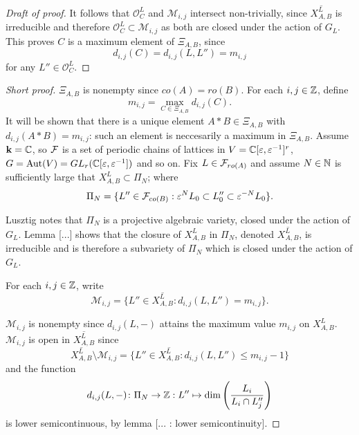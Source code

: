 \documentclass[a4paper, 11pt]{report}
\begin{document}
\begin{proof}[Draft of proof]
It follows that $\mathcal{O}_C^L$ and $\mathcal{M}_{i,j}$ intersect non-trivially, since $\overline{X_{A,B}^L}$ is irreducible and therefore $\mathcal{O}_C^L\subset \mathcal{M}_{i,j}$ as both are closed under the action of $G_L$. This proves $C$ is a maximum element of $\Xi_{A,B}$, since
\begin{equation*}
d_{i,j}(C) = d_{i,j}(L,L'') = m_{i,j}
\end{equation*}
for any $L''\in\mathcal{O}_C^L$.

\end{proof}

\begin{proof}[Short proof]
$\Xi_{A,B}$ is nonempty since $co(A)=ro(B)$. For each $i,j\in\mathbb{Z}$, define
\begin{equation*}
m_{i,j} = \max_{C\in\Xi_{A,B}} d_{i,j}(C).
\end{equation*}
It will be shown that there is a unique element $A\ast B\in \Xi_{A,B}$ with $d_{i,j}(A\ast B) = m_{i,j}$: such an element is neccesarily a maximum in $\Xi_{A,B}$. Assume $\mathbf{k}=\mathbb{C}$, so $\mathcal{F}$ is a set of periodic chains of lattices in $V = \mathbb{C}[\varepsilon,\varepsilon^{-1}]^r$, $G = \operatorname{Aut}(V) = GL_{r}(\mathbb{C}[\varepsilon,\varepsilon^{-1}])$ and so on. Fix $L\in\mathcal{F}_{ro(A)}$ and assume $N\in\mathbb{N}$ is sufficiently large that $X_{A,B}^L\subset \Pi_N$; where
\begin{equation*}
\Pi_N = \{L''\in\mathcal{F}_{co(B)}: \varepsilon^N L_0\subset L_0''\subset \varepsilon^{-N} L_0\}.
\end{equation*}

Lusztig notes \cite{lusztig99} that $\Pi_N$ is a projective algebraic variety, closed under the action of $G_L$. Lemma [...] shows that the closure of $X_{A,B}^L$ in $\Pi_N$, denoted $\overline{X_{A,B}^L}$, is irreducible and is therefore a subvariety of $\Pi_N$ which is closed under the action of $G_L$.

For each $i,j\in\mathbb{Z}$, write
\begin{equation*}
\mathcal{M}_{i,j} = \{L''\in\overline{X_{A,B}^L}: d_{i,j}(L,L'') = m_{i,j}\}.
\end{equation*}

$\mathcal{M}_{i,j}$ is nonempty since $d_{i,j}(L,-)$ attains the maximum value $m_{i,j}$ on $X_{A,B}^L$. $\mathcal{M}_{i,j}$ is open in $\overline{X_{A,B}^L}$ since
\begin{equation*}
\overline{X_{A,B}^L}\setminus \mathcal{M}_{i,j} = \{L''\in\overline{X_{A,B}^L}: d_{i,j}(L,L'')\le m_{i,j} - 1\}
\end{equation*}
and the function
\begin{equation*}
d_{i,j}(L,-)\colon\Pi_N\to\mathbb{Z} : L''\mapsto \dim\left(\frac{L_i}{L_i\cap L_j''}\right)
\end{equation*}
is lower semicontinuous, by lemma [... : lower semicontinuity].


\end{proof}
\end{document}
